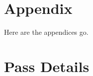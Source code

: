 
\chapter{Appendix}

\par Here are the appendices go.

\chapter{Pass Details}\label{app:pass_details}